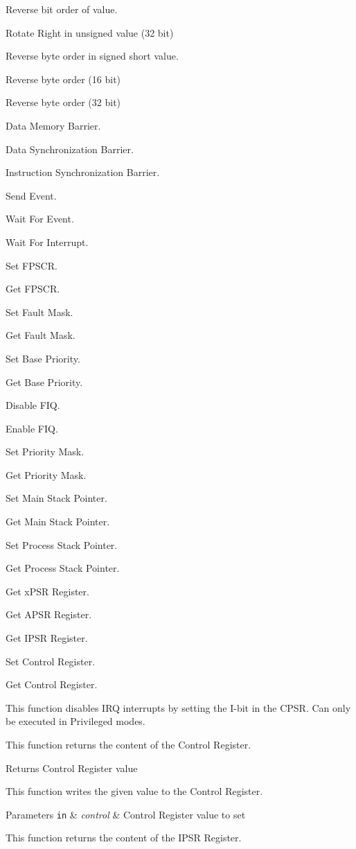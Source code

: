 Reverse bit order of value.

Rotate Right in unsigned value (32 bit)

Reverse byte order in signed short value.

Reverse byte order (16 bit)

Reverse byte order (32 bit)

Data Memory Barrier.

Data Synchronization Barrier.

Instruction Synchronization Barrier.

Send Event.

Wait For Event.

Wait For Interrupt.

Set F\-P\-S\-C\-R.

Get F\-P\-S\-C\-R.

Set Fault Mask.

Get Fault Mask.

Set Base Priority.

Get Base Priority.

Disable F\-I\-Q.

Enable F\-I\-Q.

Set Priority Mask.

Get Priority Mask.

Set Main Stack Pointer.

Get Main Stack Pointer.

Set Process Stack Pointer.

Get Process Stack Pointer.

Get x\-P\-S\-R Register.

Get A\-P\-S\-R Register.

Get I\-P\-S\-R Register.

Set Control Register.

Get Control Register.

This function disables I\-R\-Q interrupts by setting the I-\/bit in the C\-P\-S\-R. Can only be executed in Privileged modes.

This function returns the content of the Control Register.

\begin{DoxyReturn}{Returns}
Control Register value
\end{DoxyReturn}
This function writes the given value to the Control Register.


\begin{DoxyParams}[1]{Parameters}
\mbox{\tt in}  & {\em control} & Control Register value to set\\
\hline
\end{DoxyParams}
This function returns the content of the I\-P\-S\-R Register.

